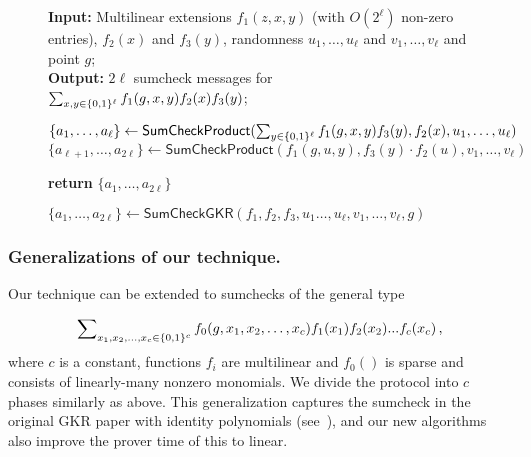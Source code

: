 {{\begin{figure}
\begin{algorithm}[H]
		\caption{\label{final_alg}$\{a_1,\ldots,a_{2\ell}\}\leftarrow \textsf{SumCheckGKR}(f_1,f_2,f_3,u_1\ldots,u_\ell,v_1,\ldots,v_\ell,g)$}\label{alg:sumcheckgkr}
		 \textbf{Input:} Multilinear extensions $f_1(z,x,y)$ (with $O(2^\ell)$ non-zero entries), $f_2(x)$ and $f_3(y)$, randomness $u_1,\ldots,u_\ell$ and $v_1,\ldots,v_\ell$ and point $g$;\\
    \textbf{Output:} 
    $2\ell$ sumcheck messages for $\sum\nolimits_{x,y\in\{0,1\}^\ell}f_1(g,x,y)f_2(x)f_3(y)$;
   
		\begin{algorithmic}[1]
\State $\{a_1,\ldots,a_\ell\}\leftarrow \textsf{SumCheckProduct}(\sum_{y\in\{0,1\}^\ell}f_1(g,x,y) f_3(y),f_2(x),u_1,\ldots,u_\ell)$
\State $\{a_{\ell+1},\ldots,a_{2\ell}\}\leftarrow \textsf{SumCheckProduct}(f_1(g,u,y) ,f_3(y)\cdot f_2(u) ,v_1,\ldots,v_\ell)$

							\State \textbf{return} $\{a_1,\ldots,a_{2\ell} \}$
		\end{algorithmic}
	\end{algorithm}
	
\end{figure}





 


\subsubsection{Generalizations of our technique.}

Our technique can be extended to sumchecks of the general type

\[
\sum\nolimits_{x_1, x_2,\ldots, x_c\in\{0,1\}^c}f_0(g,x_1, x_2,\ldots, x_c)f_1(x_1)f_2(x_2)...f_c(x_c)\, ,
\]
where $c$ is a constant, functions $f_i$ are multilinear and $f_0()$ is sparse and consists of linearly-many nonzero monomials. We divide the protocol into $c$ phases similarly as above. This generalization captures the sumcheck in the original GKR paper with identity polynomials (see~\cite{GKR}), and our new algorithms also improve the prover time of this to linear.





















}}
